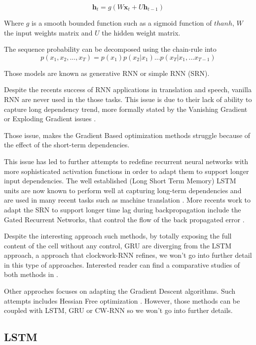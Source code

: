\documentclass[a4paper,10pt]{article}
\begin{document}
$$
\textbf{h}_t = g(W\textbf{x}_t + U\textbf{h}_{t-1})
$$

Where $g$ is a smooth bounded function such as a sigmoid function of $thanh$, $W$ the input weights matrix and $U$ the hidden weight matrix.

The sequence probability can be decomposed using the chain-rule into $$  p(x_1,x_2,...,x_T) = p(x_1)p(x_2|x_1)...p(x_T|x_1,...x_{T-1})  $$

Those models are known as generative RNN or simple RNN (SRN).

Despite the recents success of RNN applications in translation and speech, vanilla RNN are never used in the those tasks. This issue is due to their lack of ability to capture long dependency trend, more formally stated by the Vanishing Gradient or Exploding Gradient issues \cite{vanishing}.

Those issue, makes the Gradient Based optimization methods struggle because of the effect of the short-term dependencies.

This issue has led to further attempts to redefine recurrent neural networks with more sophisticated activation functions in order to adapt them to support longer input dependencies. The well established (Long Short Term Memory) LSTM units \cite{lstm}  are now known to perform well at capturing long-term dependencies and are used in many recent tasks such as machine translation \cite{susts}.
More recents work to adapt the SRN to support longer time lag during backpropagation include the Gated Recurrent Networks, that control the flow of the back propagated error \cite{grn}. \newline

Despite the interesting approach such methods, by totally exposing the full content of the cell without any control, GRU are diverging from the LSTM approach, a approach that clockwork-RNN refines, we won't go into further detail in this type of approaches. Interested reader can find a comparative studies of both methods  in \cite{empir}.

Other approches focuses on adapting the Gradient Descent algorithms. Such attempts includes Hessian Free optimization \cite{hf_opti}. However, those methods can be coupled with LSTM, GRU or CW-RNN so we won't go into further details.

\subsection{LSTM}
\end{document}
